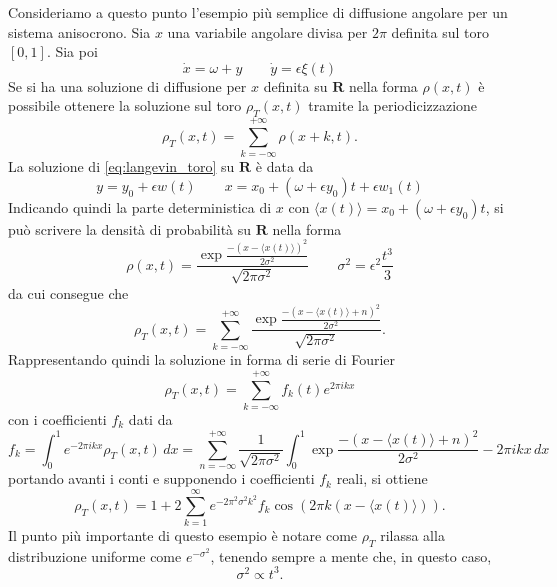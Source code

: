 \documentclass[10pt,a4paper]{article}
\begin{document}
Consideriamo a questo punto l'esempio più semplice di diffusione angolare per un sistema anisocrono. Sia $x$ una variabile angolare divisa per $2\pi$ definita sul toro $[0, 1]$. Sia poi
\begin{equation}
	\dot{x} = \omega + y \quad\quad \dot{y} = \epsilon\xi(t)
	\label{eq:langevin_toro}
\end{equation}
Se si ha una soluzione di diffusione per $x$ definita su $\mathbf{R}$ nella forma $\rho(x,t)$ è possibile ottenere la soluzione sul toro $\rho_T(x,t)$ tramite la periodicizzazione
\begin{equation}
	\rho_T(x,t) = \sum_{k=-\infty}^{+\infty} \rho(x+k,t).
\end{equation}
La soluzione di \eqref{eq:langevin_toro} su $\mathbf{R}$ è data da
\begin{equation}
	y = y_0 + \epsilon w(t) \quad\quad x = x_0 + (\omega + \epsilon y_0) t + \epsilon w_1(t)
\end{equation}
Indicando quindi la parte deterministica di $x$ con $\langle x(t) \rangle = x_0 + (\omega + \epsilon y_0) t$, si può scrivere la densità di probabilità su $\mathbf{R}$ nella forma
\begin{equation}
	\rho(x,t) = \frac{\exp{\frac{-(x-\langle x(t)\rangle)^2}{2\sigma^2}}}{\sqrt{2\pi\sigma^2}} \quad\quad \sigma^2 = \epsilon^2 \frac{t^3}{3}
\end{equation}
da cui consegue che
\begin{equation}
	\rho_T(x,t) = \sum_{k=-\infty}^{+\infty} \frac{\exp{\frac{-(x-\langle x(t)\rangle + n)^2}{2\sigma^2}}}{\sqrt{2\pi\sigma^2}}.
\end{equation}
Rappresentando quindi la soluzione in forma di serie di Fourier
\begin{equation}
	\rho_T(x,t) = \sum_{k=-\infty}^{+\infty} f_k(t)e^{2\pi i k x}
\end{equation}
con i coefficienti $f_k$ dati da
\begin{equation}
	f_k = \int_0^1 e^{-2\pi i k x} \rho_T(x,t)\,dx = \sum_{n=-\infty}^{+\infty} \frac{1}{\sqrt{2\pi\sigma^2}} \int_0^1 \exp{\frac{-(x-\langle x(t) \rangle + n)^2}{2\sigma^2} -2\pi i k x}\,dx
\end{equation}
portando avanti i conti e supponendo i coefficienti $f_k$ reali, si ottiene
\begin{equation}
	\rho_T(x,t) = 1+2\sum_{k=1}^\infty e^{-2\pi^2\sigma^2k^2} f_k \cos(2\pi k (x-\langle x(t) \rangle)).
\end{equation}
Il punto più importante di questo esempio è notare come $\rho_T$ rilassa alla distribuzione uniforme come $e^{-\sigma^2}$, tenendo sempre a mente che, in questo caso,
\begin{equation}
	\sigma^2 \propto t^{3}.
\end{equation}
\end{document}
